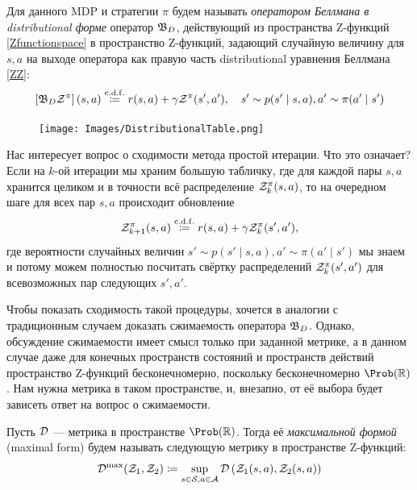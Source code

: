 \begin{definition}
Для данного MDP и стратегии $\pi$ будем называть \emph{оператором Беллмана в distributional форме} оператор $\mathfrak{B}_D$, действующий из пространства Z-функций \eqref{Zfunctionspace} в пространство Z-функций, задающий случайную величину для $s, a$ на выходе оператора как правую часть distributional уравнения Беллмана \eqref{ZZ}:
$$\left[\mathfrak{B}_D \mathcal{Z}^\pi\right](s, a) \mathrel{\stackrel{\mathrm{c.d.f.}}\coloneqq} r(s, a) + \gamma \mathcal{Z}^\pi(s', a'), \quad s' \sim p(s' \mid s, a), a' \sim \pi(a' \mid s')$$
\end{definition}

\begin{figure}
\vspace{-0.5cm}
\centering
\texttt{[image: Images/DistributionalTable.png]}
\vspace{-0.9cm}
\end{figure}

Нас интересует вопрос о сходимости метода простой итерации. Что это означает? Если на $k$-ой итерации мы храним большую табличку, где для каждой пары $s, a$ хранится целиком и в точности всё распределение $\mathcal{Z}^\pi_k(s, a)$, то на очередном шаге для всех пар $s, a$ происходит обновление
\begin{equation}\label{distrpolicyevalupdate}
    \mathcal{Z}^\pi_{k+1}(s, a) \mathrel{\stackrel{\mathrm{c.d.f.}}\coloneqq} r(s, a) + \gamma \mathcal{Z}^\pi_k(s', a'),
\end{equation}
где вероятности случайных величин $s' \sim p(s' \mid s, a), a' \sim \pi(a' \mid s')$ мы знаем и потому можем полностью посчитать свёртку распределений $\mathcal{Z}^{\pi}_k(s', a')$ для всевозможных пар следующих $s', a'$. 

Чтобы показать сходимость такой процедуры, хочется в аналогии с традиционным случаем доказать сжимаемость оператора $\mathfrak{B}_D$. Однако, обсуждение сжимаемости имеет смысл только при заданной метрике, а в данном случае даже для конечных пространств состояний и пространств действий пространство Z-функций бесконечномерно, поскольку бесконечномерно $\Prob (\R)$. Нам нужна метрика в таком пространстве, и, внезапно, от её выбора будет зависеть ответ на вопрос о сжимаемости.

\begin{definition}
Пусть $\mathcal{D}$ --- метрика в пространстве $\Prob (\R)$. Тогда её \emph{максимальной формой} (maximal form) будем называть следующую метрику в пространстве Z-функций:
$$\mathcal{D}^{\max}(\mathcal{Z}_1, \mathcal{Z}_2) \coloneqq \sup\limits_{s \in \mathcal{S}, a \in \mathcal{A}} \mathcal{D} \left( \mathcal{Z}_1(s, a), \mathcal{Z}_2(s, a) \right)$$
\end{definition}

